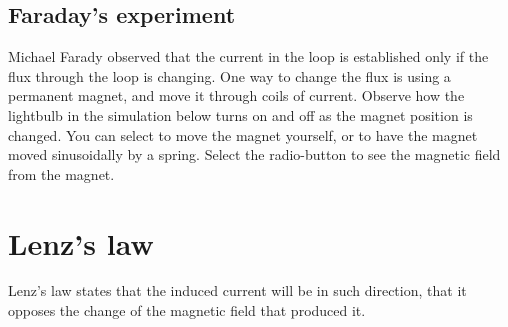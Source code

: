 \documentclass{ximera}
\begin{document}
\begin{example}
\subsection{Faraday's experiment}
Michael Farady observed that the current in the loop is established only if the flux through the loop is changing. One way to change the flux is using a permanent magnet, and move it through coils of current. Observe how the lightbulb in the simulation below turns on and off as the magnet position is changed. You can select to move the magnet yourself, or to have the magnet moved sinusoidally by a spring. Select the radio-button to see the magnetic field from the magnet.

\begin{center}  
\end{center} 
\end{example}

\section{Lenz's law}


Lenz's law states that the induced current will be in such direction, that it opposes the change of the magnetic field that produced it.
\end{document}

